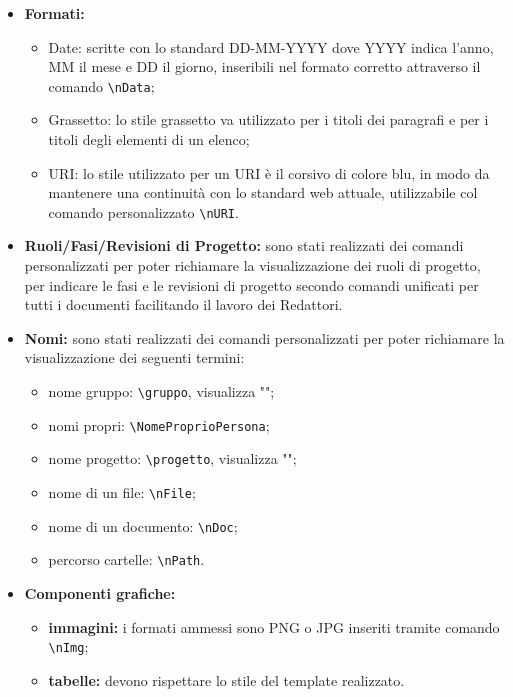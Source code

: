 \documentclass[NormeDiProgetto.tex]{subfiles}
\begin{document}
\begin{itemize}
			\item \textbf{Formati:}
			\begin{itemize}
				\item Date: scritte con lo standard DD-MM-YYYY dove YYYY indica l'anno, MM il mese e DD il giorno, inseribili nel formato corretto attraverso il comando \texttt{\textbackslash nData};
				\item Grassetto: lo stile grassetto va utilizzato per i titoli dei paragrafi e per i titoli degli elementi di un elenco; 
				\item URI: lo stile utilizzato per un URI è il corsivo di colore blu, in modo da mantenere una continuità con lo standard web attuale, utilizzabile col comando personalizzato  \texttt{\textbackslash nURI}.
			\end{itemize}
			
			\item \textbf{Ruoli/Fasi/Revisioni di Progetto:} sono stati realizzati dei comandi personalizzati per poter richiamare la visualizzazione dei ruoli di progetto, per indicare le fasi e le revisioni di progetto secondo comandi unificati per tutti i documenti facilitando il lavoro dei Redattori.
			
			\item \textbf{Nomi:} sono stati realizzati dei comandi personalizzati per poter richiamare la visualizzazione dei seguenti termini:
			\begin{itemize}
				\item nome gruppo: \texttt{\textbackslash gruppo}, visualizza "\gruppo";
				\item nomi propri: \texttt{\textbackslash NomeProprioPersona};
				\item nome progetto: \texttt{\textbackslash progetto}, visualizza "\progetto";
				\item nome di un file: \texttt{\textbackslash nFile};
				\item nome di un documento: \texttt{\textbackslash nDoc};
				\item percorso cartelle: \texttt{\textbackslash nPath}.
			\end{itemize}
		
			\item \textbf{Componenti grafiche:}
			 \begin{itemize}
			 	\item \textbf{immagini:} i formati ammessi sono PNG o JPG inseriti tramite comando \texttt{\textbackslash nImg}; 
			 	\item \textbf{tabelle:} devono rispettare lo stile del template realizzato.
			 \end{itemize}
			
		\end{itemize}
	
\end{document}
